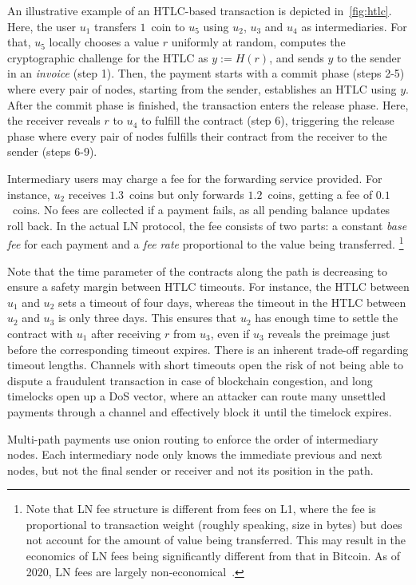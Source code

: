 An illustrative example of an HTLC-based transaction is depicted in~\cref{fig:htlc}.
Here, the user $u_1$ transfers $1$~coin to $u_5$ using $u_2$, $u_3$ and $u_4$ as intermediaries.
For that, $u_5$ locally chooses a value $r$ uniformly at random, computes the cryptographic challenge for the HTLC as $y := H(r)$, and sends $y$ to the sender in an \textit{invoice} (step 1).
Then, the payment starts with a commit phase (steps 2-5) where every pair of nodes, starting from the sender, establishes an HTLC using $y$.
After the commit phase is finished, the transaction enters the release phase.
Here, the receiver reveals $r$ to $u_4$ to fulfill the contract (step 6), triggering the release phase where every pair of nodes fulfills their contract from the receiver to the sender (steps 6-9).

Intermediary users may charge a fee for the forwarding service provided. 
For instance, $u_2$ receives $1.3$~coins but only forwards $1.2$~coins, getting a fee of $0.1$~coins.
No fees are collected if a payment fails, as all pending balance updates roll back.
In the actual LN protocol, the fee consists of two parts: a constant \textit{base fee} for each payment and a \textit{fee rate} proportional to the value being transferred.
\footnote{Note that LN fee structure is different from fees on L1, where the fee is proportional to transaction weight (roughly speaking, size in bytes) but does not account for the amount of value being transferred. This may result in the economics of LN fees being significantly different from that in Bitcoin. As of 2020, LN fees are largely non-economical~\cite{Beres2019}.}

Note that the time parameter of the contracts along the path is decreasing to ensure a safety margin between HTLC timeouts.
For instance, the HTLC between $u_1$ and $u_2$ sets a timeout of four days, whereas the timeout in the HTLC between $u_2$ and $u_3$ is only three days.
This ensures that $u_2$ has enough time to settle the contract with $u_1$ after receiving $r$ from $u_3$, even if $u_3$ reveals the preimage just before the corresponding timeout expires.
There is an inherent trade-off regarding timeout lengths.
Channels with short timeouts open the risk of not being able to dispute a fraudulent transaction in case of blockchain congestion, and long timelocks open up a DoS vector, where an attacker can route many unsettled payments through a channel and effectively block it until the timelock expires.

Multi-path payments use onion routing to enforce the order of intermediary nodes.
Each intermediary node only knows the immediate previous and next nodes, but not the final sender or receiver and not its position in the path.



